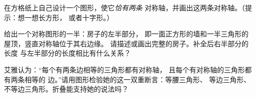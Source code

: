 \begin{exercise}[$\star\star$]\label{exo:g4:symmetry:9}
在方格纸上自己设计一个图形，使它\emph{恰有两条}
对称轴，并画出这两条对称轴。（提示：想一想长方形，
或者十字形。）
\end{exercise}

\begin{exercise}[$\star\star$]\label{exo:g4:symmetry:10}
给出一个对称图形的一半：房子的左半部分，
即一面正方形的墙和一半三角形的屋顶，竖直对称轴位于其右边缘。
请描述或画出完整的房子。补全后右半部分的长度
与左半部分的长度相比有什么关系？
\end{exercise}

\begin{exercise}[$\star\star$]\label{exo:g4:symmetry:11}
艾雅认为：“每个有两条边相等的三角形都有对称轴，
且每个有对称轴的三角形都有两条相等的
边。”请用图形检验她的这一双重断言：等腰三角形、
等边三角形、不等边三角形。折叠能支持她的说法吗？
\end{exercise}

